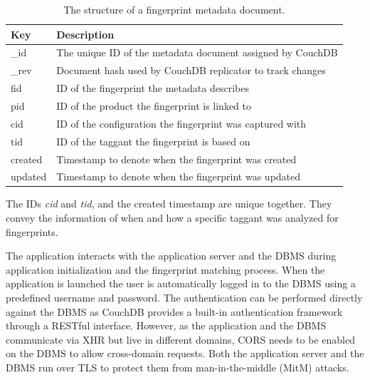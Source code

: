 \documentclass[thesis.tex]{subfiles}
\begin{document}
\begin{table}[ht]
	\caption{The structure of a fingerprint metadata document.} \label{table:fingerprint-metadata-schema}

	\begin{center}
	\begin{tabular}{| m{1.4cm} | m{11.3cm} |}

		\hline
		\textbf{Key}	& \textbf{Description} \\ \hline
		\_id			& The unique ID of the metadata document assigned by CouchDB \\
		\hline
		\_rev 		& Document hash used by CouchDB replicator to track changes \\
		\hline
		fid 			& ID of the fingerprint the metadata describes \\
		\hline
		pid 			& ID of the product the fingerprint is linked to \\
		\hline
		cid 			& ID of the configuration the fingerprint was captured with \\
		\hline
		tid 			& ID of the taggant the fingerprint is based on \\
		\hline
		created		& Timestamp to denote when the fingerprint was created \\
		\hline
		updated		& Timestamp to denote when the fingerprint was updated \\
		\hline
	\end{tabular}
	\end{center}
\end{table}

\noindent The IDs \emph{cid} and \emph{tid}, and the created timestamp are unique together. They convey the information of when and how a specific taggant was analyzed for fingerprints.

The application interacts with the application server and the DBMS during application initialization and the fingerprint matching process. When the application is launched the user is automatically logged in to the DBMS using a predefined username and password. The authentication can be performed directly against the DBMS as CouchDB provides a built-in authentication framework through a RESTful interface. However, as the application and the DBMS communicate via XHR but live in different domains, CORS needs to be enabled on the DBMS to allow cross-domain requests. Both the application server and the DBMS run over TLS to protect them from man-in-the-middle (MitM) attacks.
\end{document}
